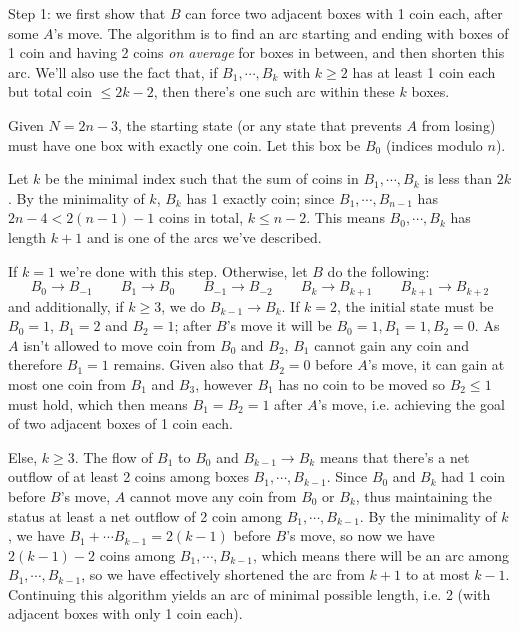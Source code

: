 \documentclass[11pt,a4paper]{article}
\begin{document}
\begin{enumerate}
		Step 1: we first show that $B$ can force two adjacent boxes with 1 coin each, after some $A$'s move.
		The algorithm is to find an arc starting and ending with boxes of 1 coin and having 2 coins \emph{on average} for boxes in between, and then shorten this arc. 
		We'll also use the fact that, if $B_1, \cdots , B_k$ with $k\ge 2$ has at least 1 coin each but total coin $\le 2k-2$, then there's one such arc within these $k$ boxes. 
		
		Given $N=2n-3$, the starting state (or any state that prevents $A$ from losing) must have one box with exactly one coin. 
		Let this box be $B_0$ (indices modulo $n$). 
		
		Let $k$ be the minimal index such that the sum of coins in $B_1, \cdots , B_k$ is less than $2k$. By the minimality of $k$, $B_k$ has 1 exactly coin; since $B_1, \cdots , B_{n-1}$ has $2n-4<2(n-1)-1$ coins in total, $k\le n-2$. 
		This means $B_0, \cdots, B_k$ has length $k+1$ and is one of the arcs we've described. 
		
		If $k=1$ we're done with this step. Otherwise, let $B$ do the following: 
		\[
		B_0\to B_{-1}\qquad B_1\to B_0\qquad B_{-1}\to B_{-2} \qquad B_k\to B_{k+1}\qquad B_{k+1}\to B_{k+2}
		\]
		and additionally, if $k\ge 3$, we do $B_{k-1}\to B_k$. 
		If $k = 2$, the initial state must be $B_0=1$, $B_1=2$ and $B_2=1$; after $B$'s move it will be $B_0=1, B_1=1, B_2=0$. As $A$ isn't allowed to move coin from $B_0$ and $B_2$, $B_1$ cannot gain any coin and therefore $B_1=1$ remains. 
		Given also that $B_2=0$ before $A$'s move, it can gain at most one coin from $B_1$ and $B_3$, however $B_1$ has no coin to be moved so $B_2\le 1$ must hold, which then means $B_1=B_2=1$ after $A$'s move, i.e. achieving the goal of two adjacent boxes of 1 coin each. 
		
		Else, $k\ge 3$. 
		The flow of $B_1$ to $B_0$ and $B_{k-1}\to B_k$ means that there's a net outflow of at least 2 coins among boxes $B_1, \cdots, B_{k-1}$. 
		Since $B_0$ and $B_k$ had 1 coin before $B$'s move, $A$ cannot move any coin from $B_0$ or $B_k$, thus maintaining the status at least a net outflow of 2 coin among $B_1, \cdots, B_{k-1}$. 
		By the minimality of $k$, we have $B_1+\cdots B_{k-1}=2(k-1)$ before $B$'s move, so now we have $2(k-1)-2$ coins among $B_1, \cdots, B_{k-1}$, which means there will be an arc among $B_1, \cdots, B_{k-1}$, so we have effectively shortened the arc from $k+1$ to at most $k-1$. 
		Continuing this algorithm yields an arc of minimal possible length, i.e. 2 (with adjacent boxes with only 1 coin each). 
		

\end{enumerate}
\end{document}
